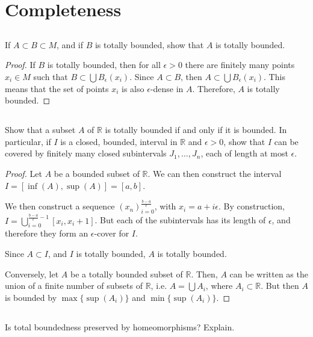 \section{Completeness}

\subsection{} If $A \subset B \subset M$, and if $B$ is totally bounded, show that $A$ is totally bounded.

\begin{proof}
If $B$ is totally bounded, then for all $\epsilon > 0$ there are finitely many points $x_i \in M$ such that $B \subset \bigcup B_\epsilon(x_i)$. Since $A \subset B$, then $A \subset \bigcup B_\epsilon(x_i)$. This means that the set of points $x_i$ is also $\epsilon$-dense in $A$. Therefore, $A$ is totally bounded.
\end{proof}

\subsection{} Show that a subset $A$ of $\mathbb{R}$ is totally bounded if and only if it is bounded. In particular, if $I$ is a closed, bounded, interval in $\mathbb{R}$ and $\epsilon > 0$, show that $I$ can be covered by finitely many closed subintervals $J_1, \dots, J_n$, each of length at most $\epsilon$.

\begin{proof}
Let $A$ be a bounded subset of $\mathbb{R}$. We can then construct the interval $I = [\inf(A), \sup(A)] = [a,b]$.

We then construct a sequence $(x_n)_{i=0}^{\frac{b-a}{\epsilon}}$, with $x_i = a + i\epsilon$. By construction, $I = \bigcup_{i=0}^{\frac{b-a}{\epsilon}-1} [x_i, x_i+1]$. But each of the subintervals has its length of $\epsilon$, and therefore they form an $\epsilon$-cover for $I$.

Since $A \subset I$, and $I$ is totally bounded, $A$ is totally bounded.

Conversely, let $A$ be a totally bounded subset of $\mathbb{R}$. Then, $A$ can be written as the union of a finite number of subsets of $\mathbb{R}$, i.e. $A = \bigcup A_i$, where $A_i \subset \mathbb{R}$. But then $A$ is bounded by $\max\{\sup(A_i)\}$ and $\min\{\sup(A_i)\}$.
\end{proof}

\subsection{} Is total boundedness preserved by homeomorphisms? Explain. 

